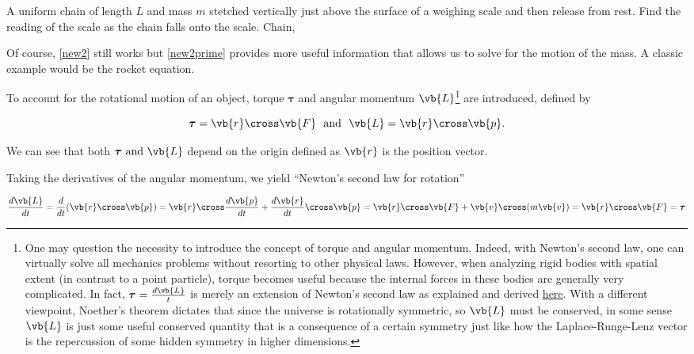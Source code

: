\documentclass[a4paper,12pt]{report}
\begin{document}
{A uniform chain of length \(L\) and mass \(m\) stetched vertically just above the surface of a weighing scale and then release from rest. Find the reading of the scale as the chain falls onto the scale.}
{Chain, } 



Of course, \cref{new2} still works but \cref{new2prime} provides more useful information that allows us to solve for the motion of the mass. A classic example would be the rocket equation.

To account for the rotational motion of an object, torque \(\boldsymbol{\tau } \) and angular momentum \(\vb{L} \)\footnote{One may question the necessity to introduce the concept of torque and angular momentum. Indeed, with Newton's second law, one can virtually solve all mechanics problems without resorting to other physical laws. However, when analyzing rigid bodies with spatial extent (in contrast to a point particle), torque becomes useful because the internal forces in these bodies are generally very complicated. In fact, \(\boldsymbol{\tau } = \frac{d \vb{L}}{t} \) is merely an extension of Newton's second law as explained and derived \href{https://knzhou.github.io/handouts/M2Sol.pdf}{here}. With a different viewpoint, Noether's theorem dictates that since the universe is rotationally symmetric, so \(\vb{L} \) must be conserved, in some sense \(\vb{L}\) is just some useful conserved quantity that is a consequence of a certain symmetry just like how the Laplace-Runge-Lenz vector is the repercussion of some hidden symmetry in higher dimensions.} are introduced, defined by

\begin{equation}
	\boldsymbol{\tau } = \vb{r} \cross \vb{F} ~\text { and }~ \vb{L} = \vb{r} \cross \vb{p} . 
\end{equation}

We can see that both \(\boldsymbol{\tau } \text{ and } \vb{L} \) depend on the origin defined as \(\vb{r} \) is the position vector.

Taking the derivatives of the angular momentum, we yield ``Newton's second law for rotation''

\begin{equation}
	\frac{d \vb{L}}{dt} = \frac{d}{dt} (\vb{r} \cross \vb{p} ) = \vb{r} \cross \frac{d\vb{p} }{dt}  + \frac{d \vb{r}}{dt} \cross \vb{p} = \vb{r} \cross \vb{F} + \vb{v} \cross (m\vb{v} ) = \vb{r} \cross \vb{F} = \boldsymbol{\tau}  
\end{equation}
\end{document}
